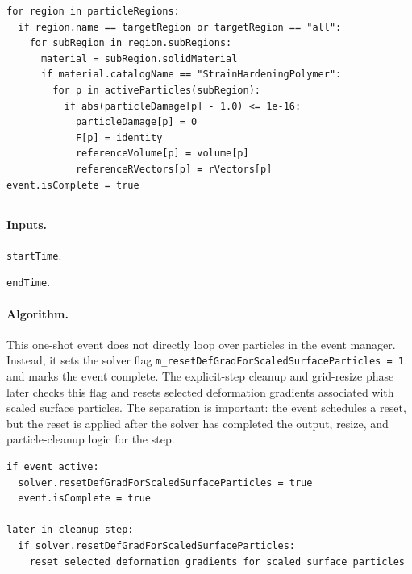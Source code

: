 \begin{lstlisting}[caption={PolymerHeal event pseudocode.}]
for region in particleRegions:
  if region.name == targetRegion or targetRegion == "all":
    for subRegion in region.subRegions:
      material = subRegion.solidMaterial
      if material.catalogName == "StrainHardeningPolymer":
        for p in activeParticles(subRegion):
          if abs(particleDamage[p] - 1.0) <= 1e-16:
            particleDamage[p] = 0
            F[p] = identity
            referenceVolume[p] = volume[p]
            referenceRVectors[p] = rVectors[p]
event.isComplete = true
\end{lstlisting}

\subsection{}
\label{subsec:event-reset-deformation-gradient}

\paragraph{Inputs.}
\begin{description}[leftmargin=*,style=nextline]
\item[\textbf{Required.}] \texttt{startTime}.
\item[\textbf{Optional.}] \texttt{endTime}.
\end{description}

\paragraph{Algorithm.}
This one-shot event does not directly loop over particles in the event manager.  Instead, it sets the solver flag \texttt{m\_resetDefGradForScaledSurfaceParticles = 1} and marks the event complete.  The explicit-step cleanup and grid-resize phase later checks this flag and resets selected deformation gradients associated with scaled surface particles.  The separation is important: the event schedules a reset, but the reset is applied after the solver has completed the output, resize, and particle-cleanup logic for the step.

\begin{lstlisting}[caption={ResetDeformationGradient event pseudocode.}]
if event active:
  solver.resetDefGradForScaledSurfaceParticles = true
  event.isComplete = true

later in cleanup step:
  if solver.resetDefGradForScaledSurfaceParticles:
    reset selected deformation gradients for scaled surface particles
\end{lstlisting}

